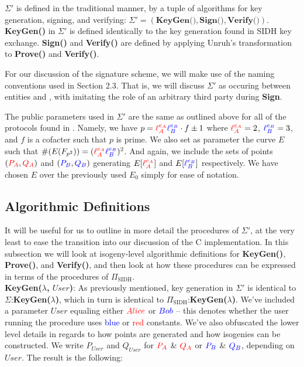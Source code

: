 $\Sigma'$ is defined in the traditional manner, by a tuple of algorithms for key generation, signing, and verifying: $\Sigma' = (\textbf{KeyGen()}, \textbf{Sign()}, \textbf{Verify()})$. \textbf{KeyGen()} in $\Sigma'$ is defined identically to the key generation found in SIDH key exchange. \textbf{Sign()} and \textbf{Verify()} are defined by applying Unruh's transformation to \textbf{Prove()} and \textbf{Verify()}.

For our discussion of the signature scheme, we will make use of the naming conventions used in Section 2.3. That is, we will discuss $\Sigma'$ as occuring between entities \bob and \alice, with \bob imitating the role of an arbitrary third party \randall during \textbf{Sign}.

The public parameters used in $\Sigma'$ are the same as outlined above for all of the protocols found in \cite{djp}. Namely, we have $p = \textcolor{red}{\ell_{A}^{e_A}}\textcolor{blue}{\ell_{B}^{e_B}} \cdot f \pm 1$ where $\textcolor{red}{\ell_{A}^{e_A}} = 2$, $\textcolor{blue}{\ell_{B}^{e_B}} = 3$, and $f$ is a cofacter such that $p$ is prime. We also set as parameter the curve $E$ such that $\#(E(F_{p^2})) = (\textcolor{red}{\ell_{A}^{e_A}}\textcolor{blue}{\ell_{B}^{e_B}})^2$. And again, we include the sets of points $(\textcolor{red}{P_A}, \textcolor{red}{Q_A})$ and $(\textcolor{blue}{P_B}, \textcolor{blue}{Q_B})$ generating $E[\textcolor{red}{\ell_{A}^{e_A}}]$ and $E[\textcolor{blue}{\ell_{B}^{e_B}}]$ respectively. We have chosen $E$ over the previously used $E_0$ simply for ease of notation.

\subsection{Algorithmic Definitions}

It will be useful for us to outline in more detail the procedures of $\Sigma'$, at the very least to ease the transition into our discussion of the C implementation. In this subsection we will look at isogeny-level algorithmic definitions for \textbf{KeyGen()}, \textbf{Prove()}, and \textbf{Verify()}, and then look at how these procedures can be expressed in terms of the procedures of $\Pi_{\text{SIDH}}$.\\

\noindent
\textbf{KeyGen($\lambda$, $User$)}: As previously mentioned, key generation in $\Sigma'$ is identical to $\Sigma$:\textbf{KeyGen($\lambda$)}, which in turn is identical to $\Pi_{\text{SIDH}}$:\textbf{KeyGen($\lambda$)}. We've included a parameter $User$ equaling either $\textcolor{red}{Alice}$ or $\textcolor{blue}{Bob}$ -- this denotes whether the user running the procedure uses \textcolor{blue}{blue} or \textcolor{red}{red} constants. We've also obfuscated the lower level details in regards to how points are generated and how isogenies can be constructed. We write $P_{User}$ and $Q_{User}$ for $\textcolor{red}{P_A}$ \& $\textcolor{red}{Q_A}$ or $\textcolor{blue}{P_B}$ \& $\textcolor{blue}{Q_B}$, depending on $User$.  The result is the following:

